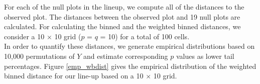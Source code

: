 For each of the null plots in the lineup, we compute all of the distances to the observed plot.
The distances between the observed plot and 19 null plots are calculated. 
For calculating the binned and the weighted binned distances, we consider a 10 $\times$ 10 grid ($p$ = $q$ = 10) for a total of 100 cells. \\

In order to  quantify  these distances, we generate empirical distributions based on 10,000 permutations of $Y$ and estimate corresponding $p$ values as lower tail percentages. 
 Figure \ref{emp_wbdist} gives  the empirical distribution of the weighted binned distance for our line-up based on a 10 $\times$ 10 grid. \\

